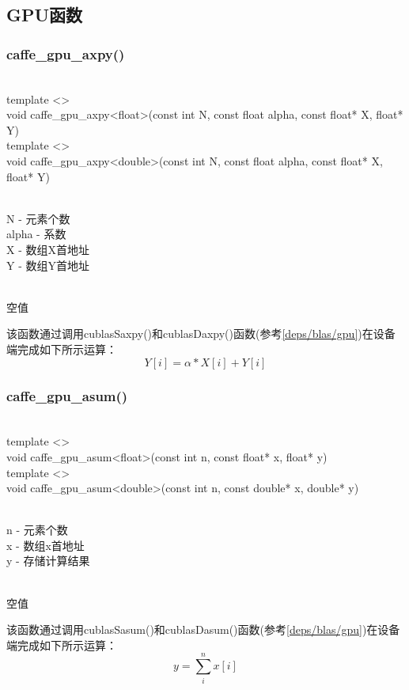 \subsection{GPU函数}\label{math/gpu/alg}
\subsubsection{caffe\_gpu\_axpy()}
\begin{cnfrmfunc}
   \item{}\\
     template <>\\
     void caffe\_gpu\_axpy<float>(const int N, const float alpha, const float* X, float* Y) \\

     template <>\\
     void caffe\_gpu\_axpy<double>(const int N, const float alpha, const float* X, float* Y)
   \item{}\\
     N - 元素个数\\
     alpha - 系数\\
     X - 数组X首地址\\
     Y - 数组Y首地址
   \item{}\\
     空值
\end{cnfrmfunc}
该函数通过调用cublasSaxpy()和cublasDaxpy()函数(参考\ref{deps/blas/gpu})在设备端完成如下所示运算：
$$
Y[i] = \alpha * X[i] + Y[i]
$$
\subsubsection{caffe\_gpu\_asum()}
\begin{cnfrmfunc}
   \item{}\\
     template <>\\
     void caffe\_gpu\_asum<float>(const int n, const float* x, float* y)\\

     template <>\\
     void caffe\_gpu\_asum<double>(const int n, const double* x, double* y)
   \item{}\\
     n - 元素个数\\
     x - 数组x首地址\\
     y - 存储计算结果
   \item{}\\
     空值
\end{cnfrmfunc}
该函数通过调用cublasSasum()和cublasDasum()函数(参考\ref{deps/blas/gpu})在设备端完成如下所示运算：
$$
y = \sum\limits_{i}^{n}x[i]
$$
